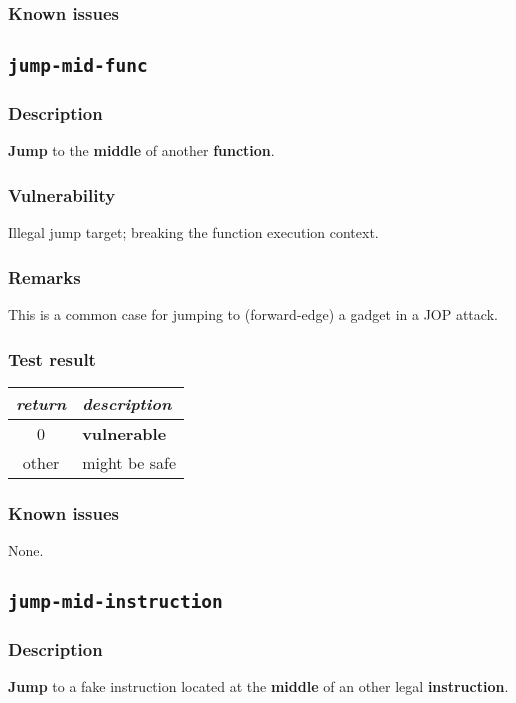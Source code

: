 \documentclass[a4paper]{book}
\begin{document}
\subsubsection{Known issues}

\newpage
\subsection{\texttt{jump-mid-func}}\label{test-jump-mid-func}

\subsubsection{Description}
\textbf{Jump} to the \textbf{middle} of another \textbf{function}.

\subsubsection{Vulnerability}
Illegal jump target; breaking the function execution context.

\subsubsection{Remarks}
This is a common case for jumping to (forward-edge) a gadget in a JOP attack.

\subsubsection{Test result}
\begin{tabular}{cl}
  \toprule
  \emph{return}  & \emph{description} \\
  \midrule
  0              & \textbf{vulnerable} \\
  other          & might be safe \\
  \bottomrule
\end{tabular}
  
\subsubsection{Known issues}

None.

\newpage
\subsection{\texttt{jump-mid-instruction}}\label{test-jump-mid-instruction}

\subsubsection{Description}
\textbf{Jump} to a fake instruction located at the \textbf{middle} of an other legal \textbf{instruction}.
\end{document}
